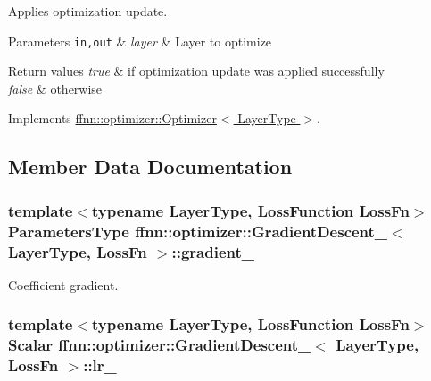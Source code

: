 Applies optimization update. 


\begin{DoxyParams}[1]{Parameters}
\mbox{\tt in,out}  & {\em layer} & Layer to optimize \\
\hline
\end{DoxyParams}

\begin{DoxyRetVals}{Return values}
{\em true} & if optimization update was applied successfully \\
\hline
{\em false} & otherwise \\
\hline
\end{DoxyRetVals}


Implements \hyperlink{classffnn_1_1optimizer_1_1_optimizer_a7c88c2794446e03ccd41628bb25d7a07}{ffnn\-::optimizer\-::\-Optimizer$<$ Layer\-Type $>$}.



\subsection{Member Data Documentation}
\hypertarget{classffnn_1_1optimizer_1_1_gradient_descent___a47f75b7c806bdd2bd254c147a35e3ae2}{
\subsubsection[{gradient\-\_\-}]{\setlength{\rightskip}{0pt plus 5cm}template$<$typename Layer\-Type, Loss\-Function Loss\-Fn$>$ {\bf Parameters\-Type} {\bf ffnn\-::optimizer\-::\-Gradient\-Descent\-\_\-}$<$ Layer\-Type, Loss\-Fn $>$\-::gradient\-\_\-\hspace{0.3cm}{\ttfamily [protected]}}}\label{classffnn_1_1optimizer_1_1_gradient_descent___a47f75b7c806bdd2bd254c147a35e3ae2}


Coefficient gradient. 

\hypertarget{classffnn_1_1optimizer_1_1_gradient_descent___a600bd6a5552e490da1b230c67a5e67d6}{
\subsubsection[{lr\-\_\-}]{\setlength{\rightskip}{0pt plus 5cm}template$<$typename Layer\-Type, Loss\-Function Loss\-Fn$>$ {\bf Scalar} {\bf ffnn\-::optimizer\-::\-Gradient\-Descent\-\_\-}$<$ Layer\-Type, Loss\-Fn $>$\-::lr\-\_\-\hspace{0.3cm}{\ttfamily [protected]}}}\label{classffnn_1_1optimizer_1_1_gradient_descent___a600bd6a5552e490da1b230c67a5e67d6}


